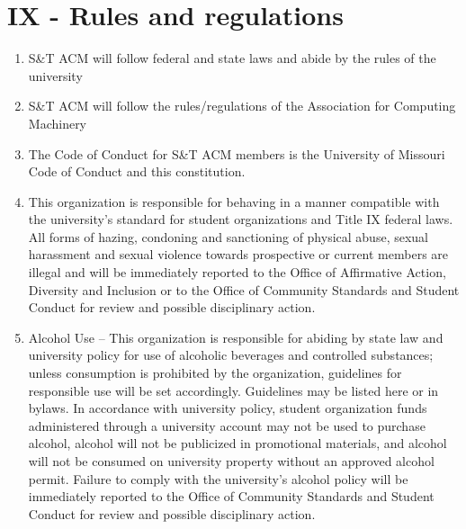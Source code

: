 
\section{IX - Rules and regulations}
  \begin{enumerate}
    \item S\&T ACM will follow federal and state laws and abide by the rules
    of the university
    \item S\&T ACM will follow the rules/regulations of the Association for Computing
    Machinery
    \item The Code of Conduct for S\&T ACM members is the University of
    Missouri Code of Conduct and this constitution.
    \item This organization is responsible for behaving in a manner compatible with
    the university’s standard for student organizations and Title IX federal laws.
    All forms of hazing, condoning and sanctioning of physical abuse, sexual
    harassment and sexual violence towards prospective or current members are
    illegal and will be immediately reported to the Office of Affirmative Action,
    Diversity and Inclusion or to the Office of Community Standards and Student
    Conduct for review and possible disciplinary action.
    \item Alcohol Use – This organization is responsible for abiding by state law
    and university policy for use of alcoholic beverages and controlled substances;
    unless consumption is prohibited by the organization, guidelines for responsible
    use will be set accordingly. {Guidelines may be listed here or in bylaws}. In
    accordance with university policy, student organization funds administered
    through a university account may not be used to purchase alcohol, alcohol will
    not be publicized in promotional materials, and alcohol will not be consumed on
    university property without an approved alcohol permit. Failure to comply with
    the university’s alcohol policy will be immediately reported to the Office of
    Community Standards and Student Conduct for review and possible disciplinary
    action.
  \end{enumerate}